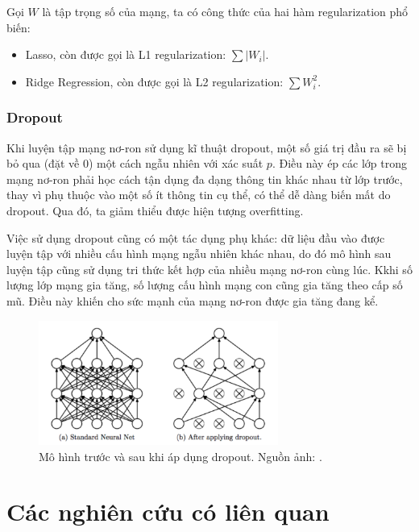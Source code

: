 \documentclass[12pt]{extreport}
\begin{document}
Gọi $ W $ là tập trọng số của mạng, ta có công thức của hai hàm regularization phổ biến:

\begin{itemize}
    \item Lasso, còn được gọi là L1 regularization: $ \sum |W_i| $.
    \item Ridge Regression, còn được gọi là L2 regularization: $ \sum W_i^2 $.
\end{itemize}

\subsubsection{Dropout}

Khi luyện tập mạng nơ-ron sử dụng kĩ thuật dropout, một số giá trị đầu ra sẽ bị bỏ qua (đặt về 0) một cách ngẫu nhiên với xác suất $ p $. Điều này ép các lớp trong mạng nơ-ron phải học cách tận dụng đa dạng thông tin khác nhau từ lớp trước, thay vì phụ thuộc vào một số ít thông tin cụ thể, có thể dễ dàng biến mất do dropout. Qua đó, ta giảm thiểu được hiện tượng overfitting.

Việc sử dụng dropout cũng có một tác dụng phụ khác: dữ liệu đầu vào được luyện tập với nhiều cấu hình mạng ngẫu nhiên khác nhau, do đó mô hình sau luyện tập cũng sử dụng tri thức kết hợp của nhiều mạng nơ-ron cùng lúc. Kkhi số lượng lớp mạng gia tăng, số lượng cấu hình mạng con cũng gia tăng theo cấp số mũ. Điều này khiến cho sức mạnh của mạng nơ-ron được gia tăng đang kể.

\begin{figure}[H]
    \centering
    \includegraphics[width=0.7\textwidth]{figure3}
    \caption{Mô hình trước và sau khi áp dụng dropout. Nguồn ảnh: \cite{JMLR:v15:srivastava14a}.}
\end{figure}

\section{Các nghiên cứu có liên quan}
\end{document}
